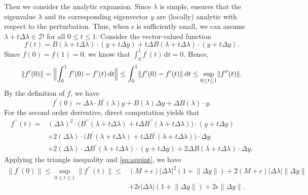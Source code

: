 \documentclass[a4paper,11pt]{article}
\newcommand{\de}{\,\mathrm{d}}
\newcommand{\region}{\mathcal{D}}
\providecommand{\abs}[1]{\lvert#1\rvert}
\providecommand{\norm}[1]{\lVert#1\rVert}
\providecommand{\Bignorm}[1]{\Bigl\lVert#1\Bigr\rVert}
\begin{document}
    Then we consider the analytic expansion.
    Since $\lambda$ is simple, \cite[Thm.~2.1]{Andrew1993} ensures that the eigenvalue $\lambda$ and its corresponding eigenvector $y$ are (locally) analytic with respect to the perturbation. 
    Thus, when $\epsilon$ is sufficiently small, we can assume $\lambda+t\Delta \lambda\in\region$ for all $0\leq t\leq 1$.
    Consider the vector-valued function 
    \begin{equation*}
        f(t) = B(\lambda+t\Delta \lambda)\cdot (y+t\Delta y) + t\Delta B(\lambda+t\Delta \lambda)\cdot (y+t\Delta y).
    \end{equation*}
    Since $f(0)=f(1)=0$, we know that $\int_{0}^{1}f^{\prime}(t)\de t=0$. Hence, 
    \begin{equation}
        \label{eq:appint}
        \norm{f^{\prime}(0)} = \Bignorm{\int_{0}^{1}f^{\prime}(0)-f^{\prime}(t) \de t}\leq \int_{0}^{1}\norm{f^{\prime}(0)-f^{\prime}(t)} \de t\leq \sup_{0\leq t\leq 1}\norm{f^{\prime\prime}(t)}. 
    \end{equation}
    By the definition of $f$, we have 
    \begin{equation}
        \label{eq:appTaylor}
        f^{\prime}(0) = \Delta\lambda \cdot B^{\prime}(\lambda) y+B(\lambda)\Delta y+\Delta B(\lambda)\cdot y.
    \end{equation}
    For the second order derivative, direct computation yields that 
    \begin{equation*}
        \begin{aligned}
            f^{\prime\prime}(t)  =& (\Delta \lambda)^{2}\cdot \bigl(B^{\prime\prime}(\lambda+t\Delta\lambda)+t\Delta B^{\prime\prime}(\lambda+t\Delta\lambda)\bigr)\cdot(y+t\Delta y)\\
            &+2(\Delta \lambda)\cdot \bigl(B^{\prime}(\lambda+t\Delta\lambda)+t\Delta B^{\prime}(\lambda+t\Delta\lambda)\bigr)\cdot\Delta y\\
            &+2(\Delta \lambda)\cdot \Delta B^{\prime}(\lambda+t\Delta\lambda)\cdot(y+t\Delta y)
            +2\Delta B(\lambda+t\Delta\lambda)\cdot\Delta y.
        \end{aligned} 
    \end{equation*}
    Applying the triangle inequality and \cref{eq:appint}, we have 
    \begin{equation}
        \label{eq:appPertPf1}
        \begin{aligned}
            \norm{f^{\prime}(0)}\leq \sup_{0\leq t\leq 1}\norm{f^{\prime\prime}(t)}\leq &(M+\epsilon)\abs{\Delta \lambda}^{2}(1+\norm{\Delta y})+2(M+\epsilon)\abs{\Delta \lambda}\norm{\Delta y}\\
            &+2\epsilon\abs{\Delta \lambda}(1+\norm{\Delta y})+2\epsilon\norm{\Delta y}.
        \end{aligned}
    \end{equation}
\end{document}
